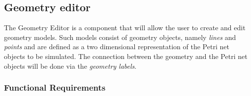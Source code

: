 \subsection{Geometry editor}
\label{sec:sf-geometry}

The Geometry Editor is a component that will allow the user to create and edit geometry models. Such models consist of geometry objects, namely \textit{lines} and \textit{points} and are defined as a two dimensional representation of the Petri net objects to be simulated. The connection between the geometry and the Petri net objects will be done via the \textit{geometry labels}.

\subsubsection{Functional Requirements}

